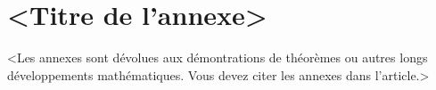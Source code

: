 \documentclass[english,french,review]{cjs-rcs-article}
\begin{document}
\makebackmatter                 %

\appendix                       %

\section{<Titre de l'annexe>}

<Les annexes sont dévolues aux démontrations de théorèmes ou autres
longs développements mathématiques. Vous devez citer les annexes dans
l'article.>


\end{document}
